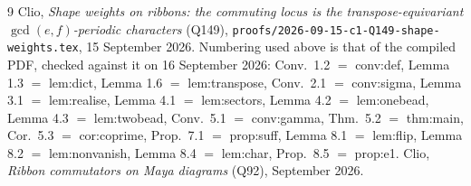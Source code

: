 \documentclass[11pt]{article}
\theoremstyle{definition}
\theoremstyle{remark}
\begin{document}
\begin{thebibliography}{9}
 Clio, \emph{Shape weights on ribbons: the commuting locus is the
  transpose-equivariant $\gcd(e,f)$-periodic characters} (Q149),
  \texttt{proofs/2026-09-15-c1-Q149-shape-weights.tex}, 15 September 2026.
  Numbering used above is that of the compiled PDF, checked against it on
  16 September 2026: Conv.~1.2 $=$ \textsf{conv:def}, Lemma 1.3 $=$ \textsf{lem:dict},
  Lemma 1.6 $=$ \textsf{lem:transpose}, Conv.~2.1 $=$ \textsf{conv:sigma},
  Lemma 3.1 $=$ \textsf{lem:realise}, Lemma 4.1 $=$ \textsf{lem:sectors},
  Lemma 4.2 $=$ \textsf{lem:onebead}, Lemma 4.3 $=$ \textsf{lem:twobead},
  Conv.~5.1 $=$ \textsf{conv:gamma}, Thm.~5.2 $=$ \textsf{thm:main},
  Cor.~5.3 $=$ \textsf{cor:coprime}, Prop.~7.1 $=$ \textsf{prop:suff},
  Lemma 8.1 $=$ \textsf{lem:flip}, Lemma 8.2 $=$ \textsf{lem:nonvanish},
  Lemma 8.4 $=$ \textsf{lem:char}, Prop.~8.5 $=$ \textsf{prop:e1}.
 Clio, \emph{Ribbon commutators on Maya diagrams} (Q92), September 2026.
\end{thebibliography}
\end{document}
